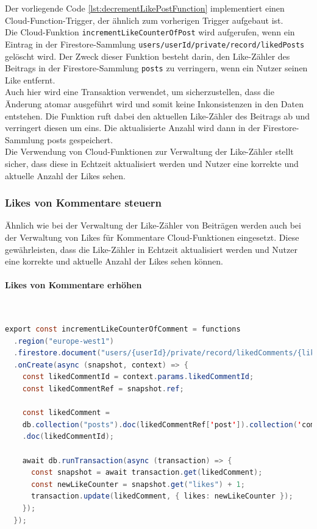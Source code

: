 Der vorliegende Code \ref{lst:decrementLikePostFunction} implementiert einen Cloud-Function-Trigger, der ähnlich zum vorherigen Trigger aufgebaut ist.
\\
Die Cloud-Funktion \texttt{incrementLikeCounterOfPost} wird aufgerufen, wenn ein Eintrag in der Firestore-Sammlung \texttt{users/{userId}/private/record/likedPosts} gelöscht wird. Der Zweck dieser Funktion besteht darin, den Like-Zähler des Beitrags in der Firestore-Sammlung \texttt{posts} zu verringern, wenn ein Nutzer seinen Like entfernt.
\\
Auch hier wird eine Transaktion verwendet, um sicherzustellen, dass die Änderung atomar ausgeführt wird und somit keine Inkonsistenzen in den Daten entstehen. Die Funktion ruft dabei den aktuellen Like-Zähler des Beitrags ab und verringert diesen um eins. Die aktualisierte Anzahl wird dann in der Firestore-Sammlung posts gespeichert.
\\
Die Verwendung von Cloud-Funktionen zur Verwaltung der Like-Zähler stellt sicher, dass diese in Echtzeit aktualisiert werden und Nutzer eine korrekte und aktuelle Anzahl der Likes sehen.

\subsubsection{Likes von Kommentare steuern}

Ähnlich wie bei der Verwaltung der Like-Zähler von Beiträgen werden auch bei der Verwaltung von Likes für Kommentare Cloud-Funktionen eingesetzt. Diese gewährleisten, dass die Like-Zähler in Echtzeit aktualisiert werden und Nutzer eine korrekte und aktuelle Anzahl der Likes sehen können.

\paragraph{Likes von Kommentare erhöhen}\mbox{} \\

\begin{lstlisting}[language=Java,caption=incrementLikeCounterOfComment Funktion,label=lst:incrementLikeCommentFunction]
  export const incrementLikeCounterOfComment = functions
  .region("europe-west1")
  .firestore.document("users/{userId}/private/record/likedComments/{likedCommentId}")
  .onCreate(async (snapshot, context) => {
    const likedCommentId = context.params.likedCommentId;
    const likedCommentRef = snapshot.ref;

    const likedComment =
    db.collection("posts").doc(likedCommentRef['post']).collection('comments')
    .doc(likedCommentId);

    await db.runTransaction(async (transaction) => {
      const snapshot = await transaction.get(likedComment);
      const newLikeCounter = snapshot.get("likes") + 1;
      transaction.update(likedComment, { likes: newLikeCounter });
    });
  });
\end{lstlisting}

